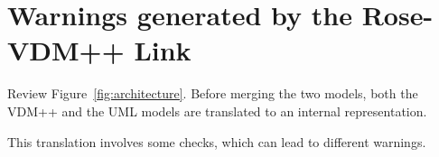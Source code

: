 \documentclass[\pformat,12pt]{article}
\newcommand{\vdmpp}{VDM++}
\begin{document}
\clearpage

\section{Warnings generated by the Rose-VDM++ Link}
\label{warnings}

Review Figure~\ref{fig:architecture}. Before merging the two models,
both the \vdmpp{} and the UML models are translated to an internal
representation.

This translation involves some checks, which can lead to different
warnings.
\end{document}
